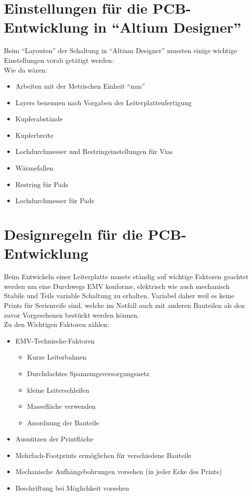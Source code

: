 \section{Einstellungen für die PCB-Entwicklung in \enquote{Altium Designer}}\label{subsec:8.1}
Beim \enquote{Layouten} der Schaltung in \enquote{Altium Designer} mussten einige wichtige Einstellungen vorab getätigt werden:\\
Wie da wären:
\begin{itemize}
	\item Arbeiten mit der Metrischen Einheit \enquote{mm}
	\item Layers benennen nach Vorgaben der Leiterplattenfertigung
	\item Kupferabstände
	\item Kupferbreite
	\item Lochdurchmesser und Restringeinstellungen für Vias
	\item Wärmefallen
	\item Restring für Pads
	\item Lochdurchmesser für Pads
\end{itemize}

\section{Designregeln für die PCB-Entwicklung}\label{subsec:8.2}
Beim Entwickeln einer Leiterplatte musste ständig auf wichtige Faktoren geachtet werden um eine Durchwegs EMV konforme, elektrisch wie auch mechanisch Stabile und Teils variable Schaltung zu erhalten.
Variabel daher weil es keine Prints für Serienreife sind, welche im Notfall auch mit anderen Bauteilen als den zuvor Vorgesehenen bestückt werden können.\\
Zu den Wichtigen Faktoren zählen:
\begin{itemize}
	\item EMV-Technische-Faktoren
	\begin{itemize}
		\item Kurze Leiterbahnen
		\item Durchdachtes Spannungsversorgungsnetz
		\item kleine Leiterschleifen
		\item Massefläche verwenden
		\item Anordnung der Bauteile
	\end{itemize}
	\item Ausnützen der Printfläche
	\item Mehrfach-Footprints ermöglichen für verschiedene Bauteile
	\item Mechanische Aufhängebohrungen vorsehen (in jeder Ecke des Prints)
	\item Beschriftung bei Möglichkeit vorsehen
\end{itemize}


